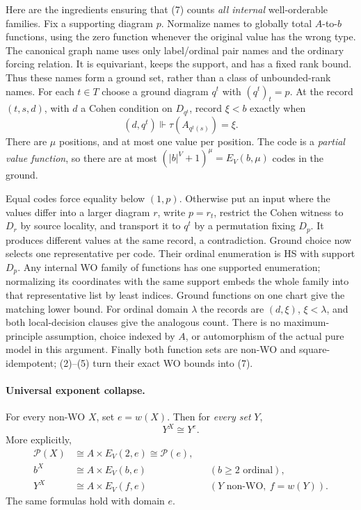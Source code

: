 Here are the ingredients ensuring that (7) counts \emph{all internal}
well-orderable families. Fix a supporting diagram $p$. Normalize names
to globally total $A$-to-$b$ functions, using the zero function whenever
the original value has the wrong type. The canonical graph name uses
only label/ordinal pair names and the ordinary forcing relation. It is
equivariant, keeps the support, and has a fixed rank bound. Thus these
names form a ground set, rather than a class of unbounded-rank names.
For each $t\in T$ choose a ground diagram $q^t$ with $(q^t)_t=p$.
At the record $(t,s,d)$, with $d$ a Cohen condition on $D_{q^t}$, record
$\xi<b$ exactly when
\[
                 (d,q^t)\Vdash\tau(A_{q^t(s)})=\xi.
\]
There are $\mu$ positions, and at most one value per position. The code
is a \emph{partial value function}, so there are at most
$(|b|^V+1)^\mu=E_V(b,\mu)$ codes in the ground.

Equal codes force equality below $(1,p)$. Otherwise put an input where
the values differ into a larger diagram $r$, write $p=r_t$, restrict
the Cohen witness to $D_r$ by source locality, and transport it to $q^t$
by a permutation fixing $D_p$. It produces different values at the same
record, a contradiction. Ground choice now selects one representative
per code. Their ordinal enumeration is HS with support $D_p$.
Any internal WO family of functions has one supported enumeration;
normalizing its coordinates with the same support embeds the whole family
into that representative list by least indices. Ground functions on
one chart give the matching lower bound. For ordinal domain $\lambda$
the records are $(d,\xi)$, $\xi<\lambda$, and both local-decision clauses
give the analogous count. There is no maximum-principle assumption,
choice indexed by $A$, or automorphism of the actual pure model in this
argument. Finally both function sets are non-WO and square-idempotent;
(2)--(5) turn their exact WO bounds into (7).

\paragraph{Universal exponent collapse.}
For every non-WO $X$, set $e=w(X)$. Then for \emph{every set} $Y$,
\[
                         Y^X\cong Y^e.                         \tag{8}
\]
More explicitly,
\[
 \begin{aligned}
 \mathcal P(X)&\cong A\times E_V(2,e)\cong\mathcal P(e),\\
 b^X&\cong A\times E_V(b,e) &&(b\geq2\text{ ordinal}),\\
 Y^X&\cong A\times E_V(f,e) &&(Y\text{ non-WO},\ f=w(Y)).
 \end{aligned}                                                   \tag{9}
\]
The same formulas hold with domain $e$.

